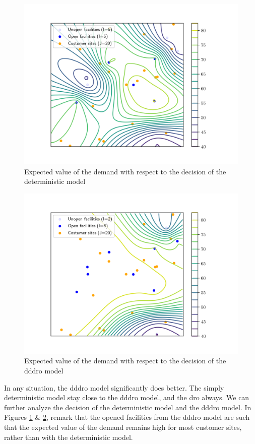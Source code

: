 \documentclass[12pt, letterpaper]{article}
\begin{document}
	\begin{figure}
		\centering
		\includegraphics*[width=\textwidth]{../figure/report_expected_open_fac_deterministic.png}
		\caption{Expected value of the demand with respect to the decision of the deterministic model}
		\label{fig:expected_deterministic}
	\end{figure}
	\begin{figure}
		\centering
		\includegraphics*[width=\textwidth]{../figure/report_expected_open_fac_ddro.png}
		\caption{Expected value of the demand with respect to the decision of the \gls{dddro} model}
		\label{fig:expected_dddro}
	\end{figure}

	In any situation, the \gls{dddro} model significantly does better. The simply deterministic model stay close to the \gls{dddro} model, and the \gls{dro} always. We can further analyze the decision of the deterministic model and the \gls{dddro} model. In Figures \ref{fig:expected_deterministic} \& \ref{fig:expected_dddro}, remark that the opened facilities from the \gls{dddro} model are such that the expected value of the demand remains high for most customer sites, rather than with the deterministic model.
	
\end{document}
